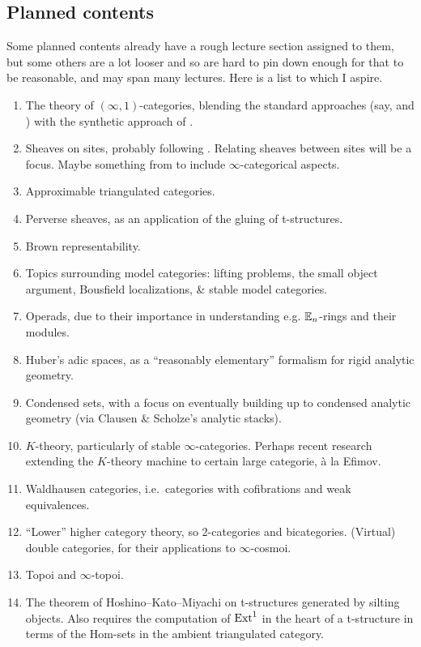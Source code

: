 \documentclass[a4paper, 11pt]{article}
\newcommand{\1}{\ensuremath{\mathbb{1}}}
\newcommand{\2}{\ensuremath{\mathbb{2}}}
\newcommand{\3}{\ensuremath{\mathbb{3}}}
\begin{document}
\subsection{Planned contents}
Some planned contents already have a rough lecture section assigned to them, but some others are a lot looser and so are hard to pin down enough for that to be reasonable, and may span many lectures.
Here is a list to which I aspire.
\begin{enumerate}[label=(\arabic*)]
\item The theory of \((\infty,1)\)-categories, blending the standard approaches (say, \cite{lurie-htt} and \cite{cisinski-book}) with the synthetic approach of \cite{riehl-verity-elements}.
\item Sheaves on sites, probably following \cite{kashiwara-schapira-book}. Relating sheaves between sites will be a focus. Maybe something from \cite{lurie-htt} to include \(\infty\)-categorical aspects.
\item Approximable triangulated categories.
\item Perverse sheaves, as an application of the gluing of t-structures.
\item Brown representability.
\item Topics surrounding model categories: lifting problems, the small object argument, Bousfield localizations, \& stable model categories.
\item Operads, due to their importance in understanding e.g. \(\mathbb{E}_n\)-rings and their modules.
\item Huber's adic spaces, as a ``reasonably elementary'' formalism for rigid analytic geometry.
\item Condensed sets, with a focus on eventually building up to condensed analytic geometry (via Clausen \& Scholze's analytic stacks).
\item \(K\)-theory, particularly of stable \(\infty\)-categories. Perhaps recent research extending the \(K\)-theory machine to certain large categorie, à la Efimov.
\item Waldhausen categories, i.e.\ categories with cofibrations and weak equivalences.
\item ``Lower'' higher category theory, so 2-categories and bicategories. (Virtual) double categories, for their applications to \(\infty\)-cosmoi.
\item Topoi and \(\infty\)-topoi.
\item The theorem of Hoshino--Kato--Miyachi on t-structures generated by silting objects. Also requires the computation of \(\operatorname{Ext}^1\) in the heart of a t-structure
in terms of the Hom-sets in the ambient triangulated category.
\end{enumerate}
\end{document}
